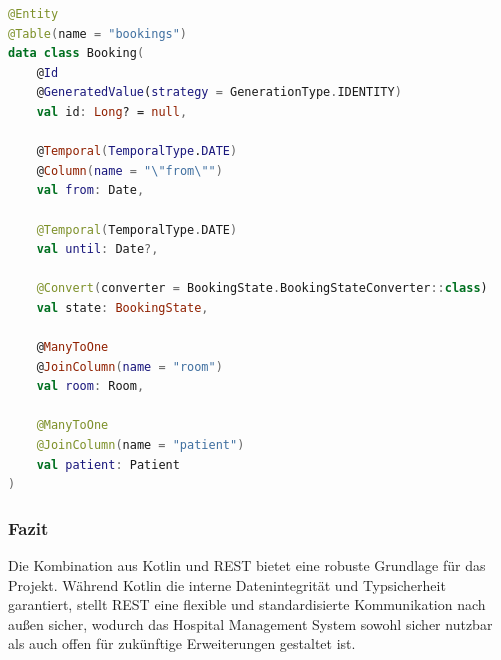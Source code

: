 \newpage
\begin{lstlisting}[language=Kotlin, caption={Booking-Entität mit Spring Annotations in Kotlin}, label={lst:bookingEntity}]
@Entity
@Table(name = "bookings")
data class Booking(
    @Id
    @GeneratedValue(strategy = GenerationType.IDENTITY)
    val id: Long? = null,

    @Temporal(TemporalType.DATE)
    @Column(name = "\"from\"")
    val from: Date,

    @Temporal(TemporalType.DATE)
    val until: Date?,

    @Convert(converter = BookingState.BookingStateConverter::class)
    val state: BookingState,

    @ManyToOne
    @JoinColumn(name = "room")
    val room: Room,

    @ManyToOne
    @JoinColumn(name = "patient")
    val patient: Patient
)

\end{lstlisting}


\subsubsection*{Fazit}
Die Kombination aus Kotlin und REST bietet eine robuste Grundlage für das Projekt. 
Während Kotlin die interne Datenintegrität und Typsicherheit garantiert, stellt REST eine flexible und standardisierte Kommunikation nach außen sicher,
wodurch das Hospital Management System sowohl sicher nutzbar als auch offen für zukünftige Erweiterungen gestaltet ist.
